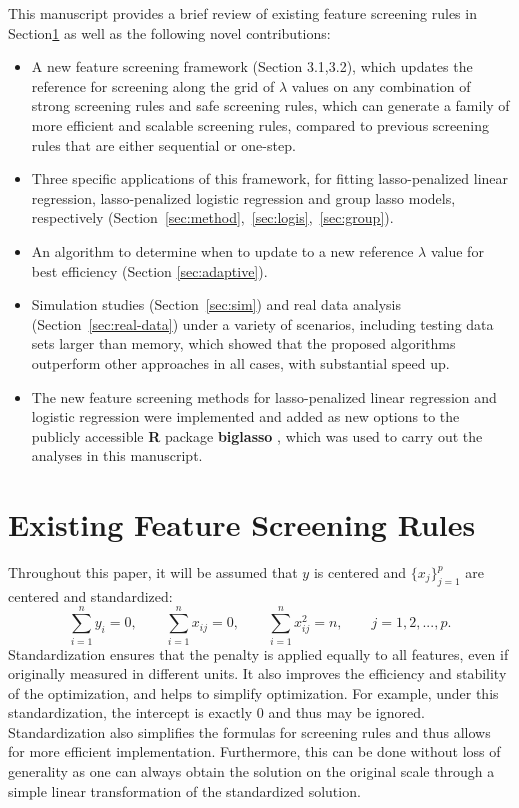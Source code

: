 \documentclass[]{interact}
\theoremstyle{plain}%
\theoremstyle{definition}
\theoremstyle{remark}
\begin{document}
This manuscript provides a brief review of existing feature screening rules in Section\ref{sec:existing} as well as the following novel contributions:

\begin{itemize}
    \item A new feature screening framework (Section 3.1,3.2), which updates the reference for screening along the grid of $\lambda$ values on any combination of strong screening rules and safe screening rules, which can generate a family of more efficient and scalable screening rules, compared to previous screening rules that are either sequential or one-step.
    \item Three specific applications of this framework, for fitting lasso-penalized linear regression, lasso-penalized logistic regression and group lasso models, respectively (Section~\ref{sec:method},~\ref{sec:logis},~\ref{sec:group}).
    \item An algorithm to determine when to update to a new reference $\lambda$ value for best efficiency (Section \ref{sec:adaptive}).
    \item Simulation studies (Section~\ref{sec:sim}) and real data analysis (Section~\ref{sec:real-data}) under a variety of scenarios, including testing data sets larger than memory, which showed that the proposed algorithms outperform other approaches in all cases, with substantial speed up.
    \item The new feature screening methods for lasso-penalized linear regression and logistic regression were implemented and added as new options to the publicly accessible \textbf{R} package \textbf{biglasso} \citep{zeng2017biglasso}, which was used to carry out the analyses in this manuscript.
\end{itemize}

\section{Existing Feature Screening Rules}
\label{sec:existing}

Throughout this paper, it will be assumed that $y$ is centered and $\{x_j\}_{j=1}^p$ are centered and standardized:
\begin{equation}
  \label{eq:std}
  \sum_{i=1}^ny_i=0, \qquad \sum_{i=1}^n x_{ij}=0, \qquad \sum_{i=1}^n x_{ij}^2=n,\qquad j=1,2,...,p.
\end{equation}
Standardization ensures that the penalty is applied equally to all features, even if originally measured in different units. It also improves the efficiency and stability of the optimization, and helps to simplify optimization.  For example, under this standardization, the intercept is exactly 0 and thus may be ignored.  Standardization also simplifies the formulas for screening rules and thus allows for more efficient implementation.  Furthermore, this can be done without loss of generality as one can always obtain the solution on the original scale through a simple linear transformation of the standardized solution.
\end{document}

